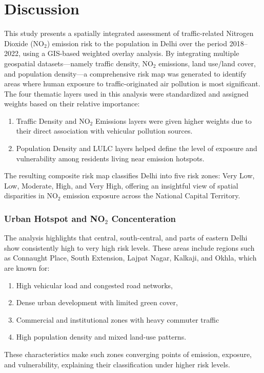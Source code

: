 \documentclass[12pt]{report}
\begin{document}
\chapter{Discussion}
This study presents a spatially integrated assessment of traffic-related Nitrogen Dioxide (NO$_2$) emission risk to the population in Delhi over the period 2018–2022, using a GIS-based weighted overlay analysis. By integrating multiple geospatial datasets—namely traffic density, NO$_2$ emissions, land use/land cover, and population density—a comprehensive risk map was generated to identify areas where human exposure to traffic-originated air pollution is most significant.\\
The four thematic layers used in this analysis were standardized and assigned weights based on their relative importance:
\begin{enumerate}
    \item Traffic Density and NO$_2$ Emissions layers were given higher weights due to their direct association with vehicular pollution sources.
    \item Population Density and LULC layers helped define the level of exposure and vulnerability among residents living near emission hotspots.
\end{enumerate}
The resulting composite risk map classifies Delhi into five risk zones: Very Low, Low, Moderate, High, and Very High, offering an insightful view of spatial disparities in NO$_2$ emission exposure across the National Capital Territory.

\subsection{Urban Hotspot and NO$_2$ Concenteration}
The analysis highlights that central, south-central, and parts of eastern Delhi show consistently high to very high risk levels. These areas include regions such as Connaught Place, South Extension, Lajpat Nagar, Kalkaji, and Okhla, which are known for:
\begin{enumerate}
    \item High vehicular load and congested road networks,
    \item Dense urban development with limited green cover,
    \item Commercial and institutional zones with heavy commuter traffic
    \item High population density and mixed land-use patterns. 
\end{enumerate}
These characteristics make such zones converging points of emission, exposure, and vulnerability, explaining their classification under higher risk levels.
\end{document}
